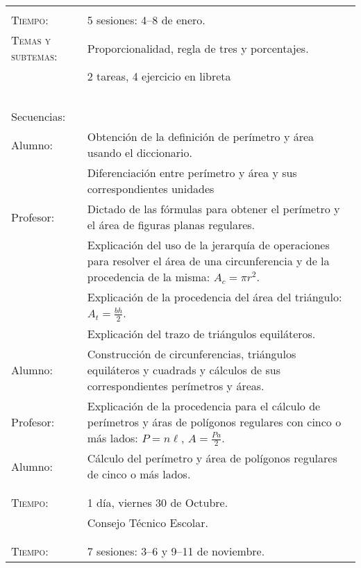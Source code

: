 \documentclass[letterpaper,10pt]{article}
\begin{document}
\begin{tabular}[t]{R{0.25\textwidth}p{0.71\textwidth}}

\\ \hline \\
    \textsc{Tiempo:}                    & 5 sesiones: 4--8  de enero. \\
    \textsc{Temas y subtemas:}          & Proporcionalidad, regla de tres y porcentajes.\\
              & 2 tareas, 4 ejercicio en libreta\\ \\
    \large{\sc Secuencias:} \\
    Alumno:     & Obtenci\'on de la definici\'on de per\'imetro y \'area usando el diccionario. \\
                & Diferenciaci\'on entre per\'imetro y \'area y sus correspondientes unidades \\
    Profesor:   & Dictado de las f\'ormulas para obtener el per\'imetro y el \'area de figuras planas regulares. \\
                & Explicaci\'on del uso de la jerarqu\'ia de operaciones para resolver el \'area de una circunferencia y de la procedencia de la misma: $A_{c} = \pi r^{2}$. \\ 
                & Explicaci\'on de la procedencia del \'area del tri\'angulo: $A_{t} = \frac{bh}{2}$. \\
                & Explicaci\'on del trazo de tri\'angulos equil\'ateros. \\
    Alumno:     & Construcci\'on de circunferencias, tri\'angulos equil\'ateros y cuadrads y c\'alculos de sus correspondientes per\'imetros y \'areas. \\
    Profesor:   & Explicaci\'on de la procedencia para el c\'alculo de per\'imetros y \'aras de pol\'igonos regulares con cinco o m\'as lados: $P = n\ell$, $A = \frac{Pa}{2} $. \\
    Alumno:     & C\'alculo del per\'imetro y \'area de pol\'igonos regulares de cinco o m\'as lados. \\
\\ \hline \\
    \textsc{Tiempo:}& 1 d\'ia, viernes 30 de Octubre. \\
                    & {\Large \sc Consejo T\'ecnico Escolar.} \\ 
\\ \hline \\
    \textsc{Tiempo:}                    & 7 sesiones: 3--6 y 9--11  de noviembre. \\

\end{tabular}
\end{document}
